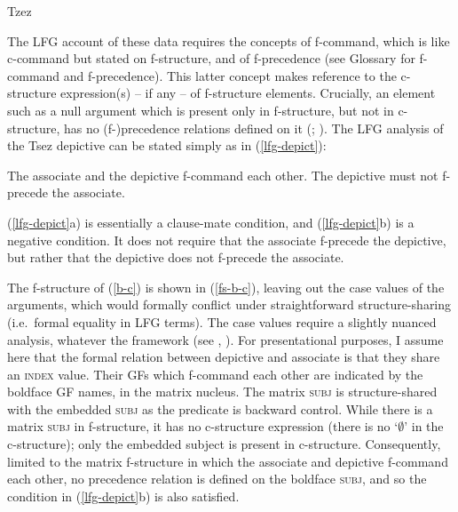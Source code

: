 \documentclass[output=paper,hidelinks]{langscibook}
\begin{document}
\ea\label{f-r} Tzez
\z\z

The LFG account of these data requires the concepts of f-command, which
is like c-command but stated on f-structure, and of f-precedence (see
Glossary for f-command and f-precedence). This latter concept makes
reference to the c-structure expression(s) -- if any -- of f-structure
elements. Crucially, an element such as a null argument which is
present only in f-structure, but not in c-structure, has no
(f-)precedence relations defined on it
(\citealp[195]{bresnan2001lexical};
\citealp[213]{BresnanEtAl2016}). The LFG analysis of the Tsez
depictive can be stated simply as in (\ref{lfg-depict}):

\ea\label{lfg-depict}\ea
The associate and the depictive f-command each other.
\ex
The depictive must not f-precede the associate.
\z\z

\newpage
(\ref{lfg-depict}a) is essentially a clause-mate condition, and (\ref{lfg-depict}b) is a
negative condition. It does not require that the associate f-precede
the depictive, but rather that the depictive does not f-precede the
associate.

The f-structure of (\ref{b-c}) is shown in (\ref{fs-b-c}), leaving out the
case values of the arguments, which would formally conflict under
straightforward structure-sharing (i.e.~formal equality in LFG
terms). The case values require a slightly nuanced analysis, whatever
the framework (see \citealp{polipots02}, \citealp{sellssubsump}). For
presentational purposes, I assume here that the formal relation
between depictive and associate is that they share an \textsc{index}
value. Their GFs which f-command each other are indicated by the
boldface GF names, in the matrix nucleus. The matrix \textsc{subj} is
structure-shared with the embedded \textsc{subj} as the predicate is
backward control. While there is a matrix \textsc{subj} in
f-structure, it has no c-structure expression (there is no
`$\emptyset$' in the c-structure); only the embedded subject is
present in c-structure. Consequently, limited to the matrix
f-structure in which the associate and depictive f-command each other,
no precedence relation is defined on the boldface \textsc{subj}, and
so the condition in (\ref{lfg-depict}b) is also satisfied.
\end{document}
